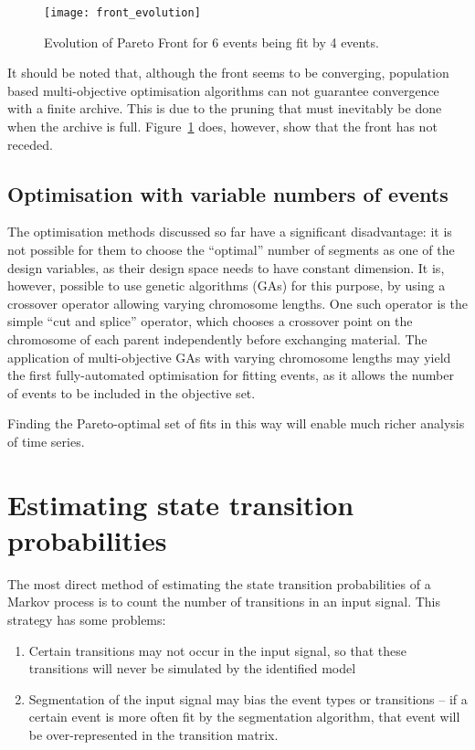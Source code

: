 \begin{figure}[htbp]
  \centering
  \texttt{[image: front\_evolution]}
  \caption{Evolution of Pareto Front for 6 events being fit by 4 events.}
  \label{fig:front_evolution}
\end{figure}

It should be noted that, although the front seems to be converging,
population based multi-objective optimisation algorithms can not
guarantee convergence with a finite archive.  This is due to the
pruning that must inevitably be done when the archive is full.
Figure~\ref{fig:front_evolution} does, however, show that the front has not
receded.

\subsection{Optimisation with variable numbers of events}
The optimisation methods discussed so far have a significant
disadvantage: it is not possible for them to choose the ``optimal''
number of segments as one of the design variables, as their design space
needs to have constant dimension. It is, however, possible to use
genetic algorithms (GAs) for this purpose, by using a crossover
operator allowing varying chromosome lengths.  One such operator is
the simple ``cut and splice'' operator, which chooses a crossover
point on the chromosome of each parent independently before exchanging
material.  The application of multi-objective GAs with varying
chromosome lengths may yield the first fully-automated optimisation
for fitting events, as it allows the number of events to be included
in the objective set.

Finding the Pareto-optimal set of fits in this way will enable much
richer analysis of time series.

\section{Estimating state transition probabilities}
The most direct method of estimating the state transition
probabilities of a Markov process is to count the number of
transitions in an input signal.  This strategy has some problems:
\begin{enumerate}
\item Certain transitions may not occur in the input signal, so that
  these transitions will never be simulated by the identified model
\item Segmentation of the input signal may bias the event types or
  transitions -- if a certain event is more often fit by the
  segmentation algorithm, that event will be over-represented in the
  transition matrix.
\end{enumerate}

